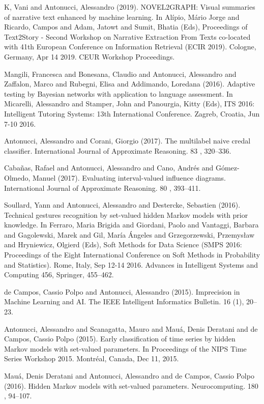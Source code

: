 \begin{cventries}
\begin{cvitems}
\item K, Vani and Antonucci, Alessandro (2019).   NOVEL2GRAPH: Visual summaries of narrative text enhanced by machine learning.   In Alípio, Mário Jorge and Ricardo, Campos and Adam, Jatowt and Sumit, Bhatia (Eds), Proceedings of Text2Story - Second Workshop on Narrative Extraction From Texts co-located with 41th European Conference on Information Retrieval (ECIR 2019).   Cologne, Germany,   Apr 14 2019.   CEUR Workshop Proceedings.
\item Mangili, Francesca and Bonesana, Claudio and Antonucci, Alessandro and Zaffalon, Marco and Rubegni, Elisa and Addimando, Loredana (2016).   Adaptive testing by Bayesian networks with application to language assessment.   In Micarelli, Alessandro and Stamper, John and Panourgia, Kitty (Eds), ITS 2016: Intelligent Tutoring Systems: 13th International Conference.   Zagreb, Croatia,   Jun 7-10 2016.
\item Antonucci, Alessandro and Corani, Giorgio (2017).   The multilabel naive credal classifier.   International Journal of Approximate Reasoning. 83 , 320–336.
\item Cabañas, Rafael and Antonucci, Alessandro and Cano, Andrés and Gómez-Olmedo, Manuel (2017).   Evaluating interval-valued influence diagrams.   International Journal of Approximate Reasoning. 80 , 393–411.
\item Soullard, Yann and Antonucci, Alessandro and Destercke, Sebastien (2016).   Technical gestures recognition by set-valued hidden Markov models with prior knowledge.   In Ferraro, Maria Brigida and Giordani, Paolo and Vantaggi, Barbara and Gagolewski, Marek and Gil, María Ángeles and Grzegorzewski, Przemysław and Hryniewicz, Olgierd (Eds), Soft Methods for Data Science (SMPS 2016: Proceedings of the Eight International Conference on Soft Methods in Probability and Statistics).   Rome, Italy, Sep 12-14 2016.   Advances in Intelligent Systems and Computing 456, Springer, 455–462.
\item de Campos, Cassio Polpo and Antonucci, Alessandro (2015).   Imprecision in Machine Learning and AI.   The IEEE Intelligent Informatics Bulletin. 16 (1), 20–23.
\item Antonucci, Alessandro and Scanagatta, Mauro and Mauá, Denis Deratani and de Campos, Cassio Polpo (2015).   Early classification of time series by hidden Markov models with set-valued parameters.   In Proceedings of the NIPS Time Series Workshop 2015.   Montréal, Canada,   Dec 11, 2015.
\item Mauá, Denis Deratani and Antonucci, Alessandro and de Campos, Cassio Polpo (2016).   Hidden Markov models with set-valued parameters.   Neurocomputing. 180 , 94–107.

\end{cvitems}
\end{cventries}
